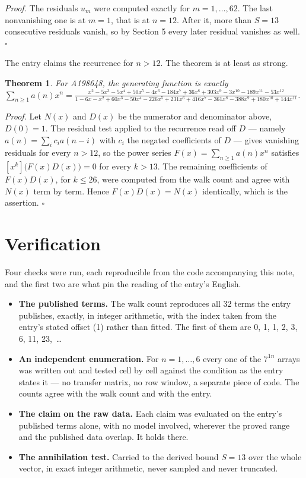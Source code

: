 \documentclass[11pt]{article}
\newtheorem{theorem}{Theorem}
\theoremstyle{definition}
\begin{document}
{\itshape Proof.} The residuals $u_m$ were computed exactly for $m = 1,\dots,62$. The last nonvanishing one is at $m = 1$, that is at $n = 12$. After it, more than $S = 13$ consecutive residuals vanish, so by Section 5 every later residual vanishes as well. $\square$

The entry claims the recurrence for $n > 12$. The theorem is at least as strong.

\begin{theorem} For A198648, the generating function is exactly $\sum_{n\ge 1} a(n)x^n = \frac{x^{2} - 5x^{3} - 5x^{4} + 50x^{5} - 4x^{6} - 184x^{7} + 36x^{8} + 303x^{9} - 3x^{10} - 189x^{11} - 53x^{12}}{1 - 6x - x^{2} + 60x^{3} - 50x^{4} - 226x^{5} + 231x^{6} + 416x^{7} - 361x^{8} - 388x^{9} + 180x^{10} + 144x^{11}}$.\end{theorem}

{\itshape Proof.} Let $N(x)$ and $D(x)$ be the numerator and denominator above, $D(0)=1$. The residual test applied to the recurrence read off $D$ --- namely $a(n) = \sum_i c_i a(n-i)$ with $c_i$ the negated coefficients of $D$ --- gives vanishing residuals for every $n > 12$, so the power series $F(x)=\sum_{n\ge 1}a(n)x^n$ satisfies $[x^k]\bigl(F(x)D(x)\bigr) = 0$ for every $k > 13$. The remaining coefficients of $F(x)D(x)$, for $k \le 26$, were computed from the walk count and agree with $N(x)$ term by term. Hence $F(x)D(x) = N(x)$ identically, which is the assertion. $\square$

\section{Verification}

Four checks were run, each reproducible from the code accompanying this note, and the first two are what pin the reading of the entry's English.

\begin{itemize}

\item {\bfseries The published terms.} The walk count reproduces all 32 terms the entry publishes, exactly, in integer arithmetic, with the index taken from the entry's stated offset (1) rather than fitted. The first of them are 0, 1, 1, 2, 3, 6, 11, 23,~\dots

\item {\bfseries An independent enumeration.} For $n = 1,\dots,6$ every one of the $7^{1n}$ arrays was written out and tested cell by cell against the condition as the entry states it --- no transfer matrix, no row window, a separate piece of code. The counts agree with the walk count and with the entry.

\item {\bfseries The claim on the raw data.} Each claim was evaluated on the entry's published terms alone, with no model involved, wherever the proved range and the published data overlap. It holds there.

\item {\bfseries The annihilation test.} Carried to the derived bound $S = 13$ over the whole vector, in exact integer arithmetic, never sampled and never truncated.

\end{itemize}
\end{document}
